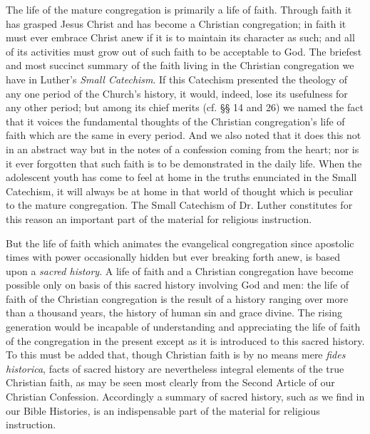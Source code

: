 The life of the mature congregation is primarily a life of faith. Through faith it has grasped Jesus Christ and has become a Christian congregation; in faith it must ever embrace Christ anew if it is to maintain its character as such; and all of its activities must grow out of such faith
to be acceptable to God. The briefest and most succinct summary of the faith living in the Christian congregation we have in Luther’s \emph{Small Catechism}. If this Catechism presented the theology of any one period of the Church’s history, it would, indeed, lose its usefulness for any other period; but among its chief merits (cf. §§ 14 and 26) we named the fact that it voices the fundamental thoughts of the Christian congregation’s life of faith which are the same in every period. And we also noted that it does this not in an abstract way but in the notes of a confession coming from the heart; nor is it ever forgotten that such faith is to be demonstrated in the daily life. When the adolescent youth has come to feel at home in the truths enunciated in the Small Catechism, it will always be at home in that world of thought which is peculiar to the mature congregation. The Small Catechism of Dr. Luther constitutes for this reason an important part of the material for religious instruction.

But the life of faith which animates the evangelical congregation since apostolic times with power occasionally hidden but ever breaking forth anew, is based upon a \emph{sacred history}. A life of faith and a Christian congregation have become possible only on basis of this sacred history involving God and men: the life of faith of the Christian congregation is the result of a history ranging over more than a thousand years, the history of human sin and grace divine. The rising generation would be incapable of understanding and appreciating the life of faith of the congregation in the present except as it is introduced to this sacred history. To this must be added that, though Christian faith is by no means mere \emph{fides historica}, facts of sacred history are nevertheless integral elements of the true Christian faith, as may be seen most clearly from the Second Article of our Christian Confession. Accordingly a summary of sacred history, such
as we find in our Bible Histories, is an indispensable part of the material for religious instruction.

